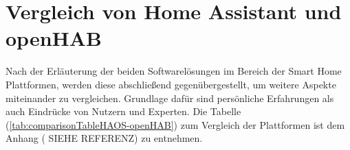 \section{Vergleich von Home Assistant und openHAB}
\label{sec:comparison-HAOS-openHAB}
    Nach der Erläuterung der beiden Softwarelösungen im Bereich der Smart Home Plattformen, werden diese abschließend 
    gegenübergestellt, um weitere Aspekte miteinander zu vergleichen. Grundlage dafür sind persönliche Erfahrungen als auch 
    Eindrücke von Nutzern und Experten. Die Tabelle (\ref{tab:comparisonTableHAOS-openHAB}) zum Vergleich 
    der Plattformen ist dem Anhang (%
    SIEHE REFERENZ) zu entnehmen.
    
